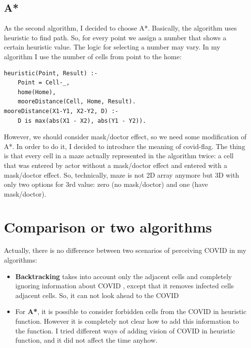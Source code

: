 \documentclass{article}
\newcommand{\C}{COVID }
\begin{document}

\subsection{A*}
As the second algorithm, I decided to choose A*.
Basically, the algorithm uses heuristic to find path. So, for every point we assign a number that shows a certain heuristic value. The logic for selecting a number may vary. In my algorithm I use the number of cells from point to the home:
\begin{verbatim}
heuristic(Point, Result) :-
    Point = Cell-_,
    home(Home),
    mooreDistance(Cell, Home, Result).
mooreDistance(X1-Y1, X2-Y2, D) :-
    D is max(abs(X1 - X2), abs(Y1 - Y2)).
\end{verbatim}

However, we should consider mask/doctor effect, so we need some modification of A*. In order to do it, I decided to introduce the meaning of covid-flag. The thing is that every cell in a maze actually represented in the algorithm twice: a cell that was entered  by actor without a mask/doctor effect and entered with a mask/doctor effect. So, technically, maze is not 2D array anymore but 3D with only two options for 3rd value: zero (no mask/doctor) and one (have mask/doctor).


\section{Comparison or two algorithms}

% 









Actually, there is no difference between two scenarios of perceiving COVID in my algorithms:

\begin{itemize}
    \item \textbf{Backtracking} takes into account only the adjacent cells and completely ignoring information about \C, except that it removes infected cells adjacent cells. So, it can not look ahead to the \C
    
    \item For \textbf{A*}, it is possible to consider forbidden cells from the \C in heuristic function. However it is completely not clear how to add this information to the function. I tried different ways of adding vision of \C in heuristic function, and it did not affect the time anyhow.
\end{itemize}
\end{document}
